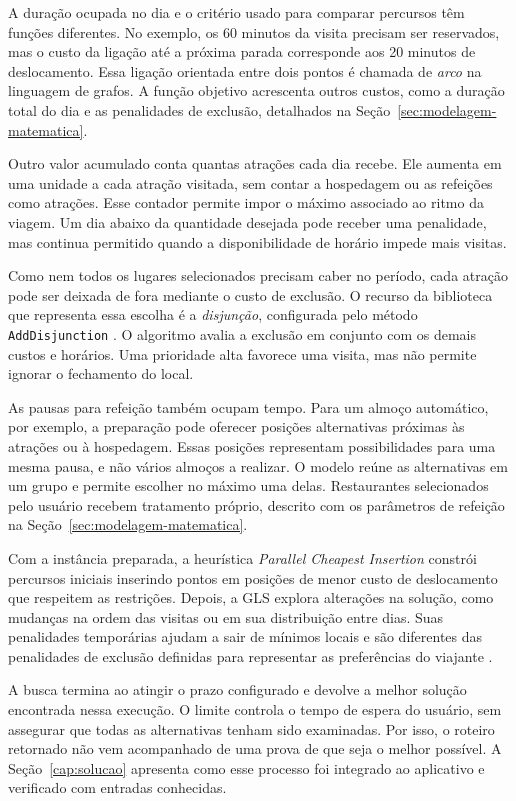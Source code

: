A duração ocupada no dia e o critério usado para comparar percursos têm funções diferentes. No exemplo, os 60 minutos da visita precisam ser reservados, mas o custo da ligação até a próxima parada corresponde aos 20 minutos de deslocamento. Essa ligação orientada entre dois pontos é chamada de \textit{arco} na linguagem de grafos. A função objetivo acrescenta outros custos, como a duração total do dia e as penalidades de exclusão, detalhados na Seção~\ref{sec:modelagem-matematica}.

Outro valor acumulado conta quantas atrações cada dia recebe. Ele aumenta em uma unidade a cada atração visitada, sem contar a hospedagem ou as refeições como atrações. Esse contador permite impor o máximo associado ao ritmo da viagem. Um dia abaixo da quantidade desejada pode receber uma penalidade, mas continua permitido quando a disponibilidade de horário impede mais visitas.

Como nem todos os lugares selecionados precisam caber no período, cada atração pode ser deixada de fora mediante o custo de exclusão. O recurso da biblioteca que representa essa escolha é a \textit{disjunção}, configurada pelo método \texttt{AddDisjunction} \cite{google_penalties}. O algoritmo avalia a exclusão em conjunto com os demais custos e horários. Uma prioridade alta favorece uma visita, mas não permite ignorar o fechamento do local.

As pausas para refeição também ocupam tempo. Para um almoço automático, por exemplo, a preparação pode oferecer posições alternativas próximas às atrações ou à hospedagem. Essas posições representam possibilidades para uma mesma pausa, e não vários almoços a realizar. O modelo reúne as alternativas em um grupo e permite escolher no máximo uma delas. Restaurantes selecionados pelo usuário recebem tratamento próprio, descrito com os parâmetros de refeição na Seção~\ref{sec:modelagem-matematica}.

Com a instância preparada, a heurística \textit{Parallel Cheapest Insertion} constrói percursos iniciais inserindo pontos em posições de menor custo de deslocamento que respeitem as restrições. Depois, a GLS explora alterações na solução, como mudanças na ordem das visitas ou em sua distribuição entre dias. Suas penalidades temporárias ajudam a sair de mínimos locais e são diferentes das penalidades de exclusão definidas para representar as preferências do viajante \cite{google_routing_options}.

A busca termina ao atingir o prazo configurado e devolve a melhor solução encontrada nessa execução. O limite controla o tempo de espera do usuário, sem assegurar que todas as alternativas tenham sido examinadas. Por isso, o roteiro retornado não vem acompanhado de uma prova de que seja o melhor possível. A Seção~\ref{cap:solucao} apresenta como esse processo foi integrado ao aplicativo e verificado com entradas conhecidas.

